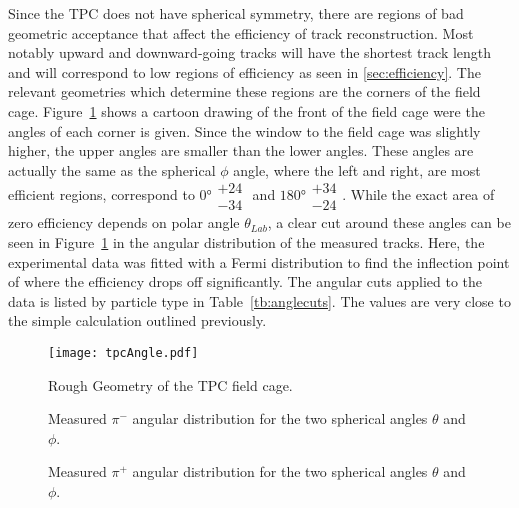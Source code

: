 Since the TPC does not have spherical symmetry, there are regions of bad geometric acceptance that affect the efficiency of track reconstruction. Most notably upward and downward-going tracks will have the shortest track length and will correspond to low regions of efficiency as seen in \ref{sec:efficiency}. The relevant geometries which determine these regions are the corners of the field cage. Figure~\ref{fig:angleEffExplanation} shows a cartoon drawing of the front of the field cage were the angles of each corner is given. Since the window to the field cage was slightly higher, the upper angles are smaller than the lower angles. These angles are actually the same as the spherical $\phi$ angle, where the left and right, are most efficient regions, correspond to  $\ang{0}\substack{+24 \\ -34}$ and $\ang{180}\substack{+34 \\ -24}$.  While the exact area of zero efficiency depends on polar angle $\theta_{Lab}$, a clear cut around these angles can be seen in Figure~\ref{fig:angleEffExplanation} in the angular distribution of the measured tracks. Here, the experimental data was fitted with a Fermi distribution to find the inflection point of where the efficiency drops off significantly. The angular cuts applied to the data is listed by particle type in Table~\ref{tb:anglecuts}. The values are very close to the simple calculation outlined previously. 


\begin{figure}[!htb]
\centering
\texttt{[image: tpcAngle.pdf]}
\caption{Rough Geometry of the TPC field cage.}
\label{fig:angleEffExplanation}
\end{figure}


\begin{figure}[!htb]%
    \centering
    \qquad

	\caption{Measured $\pi^-$ angular distribution for the two spherical angles $\theta$ and $\phi$.}
    \label{fig:pim}
\end{figure}


\begin{figure}[!htb]%
    \centering
    \qquad
     \caption{Measured $\pi^+$ angular distribution for the two spherical angles $\theta$ and $\phi$.}
        \label{fig:pip}
\end{figure}


